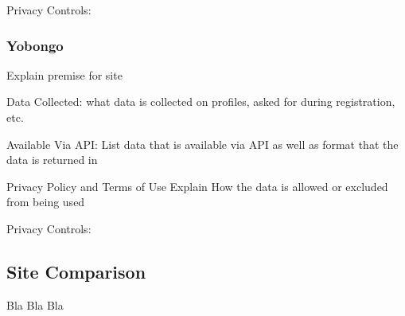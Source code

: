 Privacy Controls:

\subsubsection{Yobongo}
Explain premise for site

Data Collected:
what data is collected on profiles, asked for during registration, etc.

Available Via API:
List data that is available via API as well as format that the data is returned
in

Privacy Policy and Terms of Use
Explain How the data is allowed or excluded from being used

Privacy Controls:

\subsection{Site Comparison}
Bla Bla Bla

